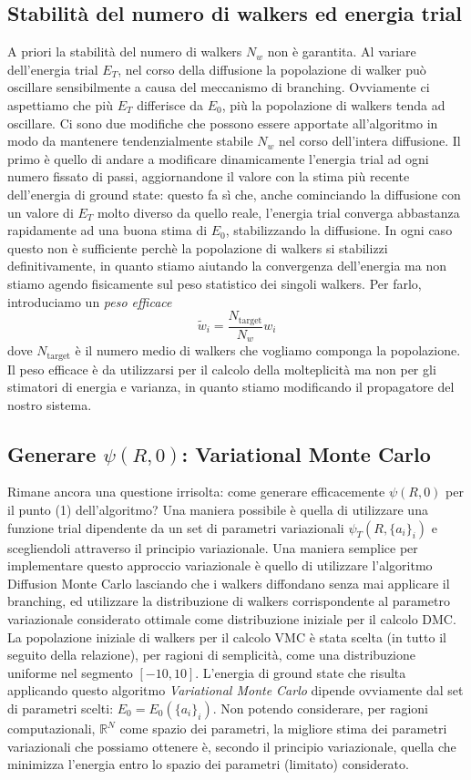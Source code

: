 \documentclass[11pt,a4paper]{article}
\begin{document}
\subsection{Stabilità del numero di walkers ed energia trial}
A priori la stabilità del numero di walkers $N_w$ non è garantita. Al variare dell'energia trial $E_T$, nel corso della diffusione la popolazione di walker può oscillare sensibilmente a causa del meccanismo di branching. Ovviamente ci aspettiamo che più $E_T$ differisce da $E_0$, più la popolazione di walkers tenda ad oscillare. Ci sono due modifiche che possono essere apportate all'algoritmo in modo da mantenere tendenzialmente stabile $N_w$ nel corso dell'intera diffusione. Il primo è quello di andare a modificare dinamicamente l'energia trial ad ogni numero fissato di passi, aggiornandone il valore con la stima più recente dell'energia di ground state: questo fa sì che, anche cominciando la diffusione con un valore di $E_T$ molto diverso da quello reale, l'energia trial converga abbastanza rapidamente ad una buona stima di $E_0$, stabilizzando la diffusione. In ogni caso questo non è sufficiente perchè la popolazione di walkers si stabilizzi definitivamente, in quanto stiamo aiutando la convergenza dell'energia ma non stiamo agendo fisicamente sul peso statistico dei singoli walkers. Per farlo, introduciamo un \emph{peso efficace}
\begin{equation}
\tilde{w}_i = \frac{N_{\text{target}}}{N_w}w_i
\end{equation}
dove $N_{\text{target}}$ è il numero medio di walkers che vogliamo componga la popolazione. Il peso efficace è da utilizzarsi per il calcolo della molteplicità ma non per gli stimatori di energia e varianza, in quanto stiamo modificando il propagatore del nostro sistema. 

\subsection{Generare $\psi(R,0)$: Variational Monte Carlo}
Rimane ancora una questione irrisolta: come generare efficacemente $\psi(R,0)$ per il punto (1) dell'algoritmo? Una maniera possibile è quella di utilizzare una funzione trial dipendente da un set di parametri variazionali $\psi_T(R, \{a_i\}_i)$ e scegliendoli attraverso il principio variazionale. Una maniera semplice per implementare questo approccio variazionale è quello di utilizzare l'algoritmo Diffusion Monte Carlo lasciando che i walkers diffondano senza mai applicare il branching, ed utilizzare la distribuzione di walkers corrispondente al parametro variazionale considerato ottimale come distribuzione iniziale per il calcolo DMC. La popolazione iniziale di walkers per il calcolo VMC è stata scelta (in tutto il seguito della relazione), per ragioni di semplicità, come una distribuzione uniforme nel segmento $[-10,10]$. L'energia di ground state che risulta applicando questo algoritmo \emph{Variational Monte Carlo} dipende ovviamente dal set di parametri scelti: $E_0 = E_0(\{a_i\}_i)$. Non potendo considerare, per ragioni computazionali, $\mathbb{R}^N$ come spazio dei parametri, la migliore stima dei parametri variazionali che possiamo ottenere è, secondo il principio variazionale, quella che minimizza l'energia entro lo spazio dei parametri (limitato) considerato. 
\end{document}
